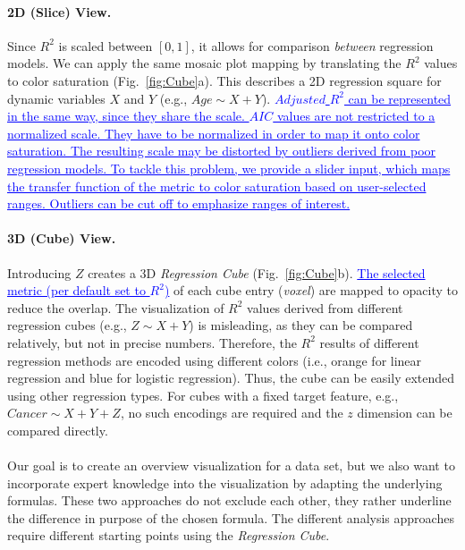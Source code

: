 \documentclass[journal]{style/vgtc} 			          %
\newcommand{\add}[1]{\textcolor{blue}{\uline{#1}}}
\begin{document}
\paragraph{2D (Slice) View.}
Since $R^2$ is scaled between $[0, 1]$, it allows for comparison \emph{between} regression models.
We can apply the same mosaic plot mapping by translating the $R^2$ values to color saturation (Fig.~\ref{fig:Cube}a).
This describes a 2D regression square for dynamic variables $X$ and $Y$ (e.g., $Age \sim X + Y$).
\add{
$Adjusted$ $R^2$ can be represented in the same way, since they share the scale.
$AIC$ values are not restricted to a normalized scale.
They have to be normalized in order to map it onto color saturation.
The resulting scale may be distorted by outliers derived from poor regression models.
To tackle this problem, we provide a slider input, which maps the transfer function of the metric to color saturation based on user-selected ranges.
Outliers can be cut off to emphasize ranges of interest.
}

\paragraph{3D (Cube) View.}
Introducing $Z$ creates a 3D \emph{Regression Cube} (Fig.~\ref{fig:Cube}b).
\add{The selected metric (per default set to $R^2$)} of each cube entry (\emph{voxel}) are mapped to opacity to reduce the overlap.
The visualization of $R^2$ values derived from different regression cubes (e.g., $Z \sim X + Y$) is misleading, as they can be compared relatively, but not in precise numbers.
Therefore, the $R^2$ results of different regression methods are encoded using different colors (i.e., orange for linear regression and blue for logistic regression).
Thus, the cube can be easily extended using other regression types.
For cubes with a fixed target feature, e.g., $Cancer \sim X + Y + Z$, no such encodings are required and the $z$ dimension can be compared directly.
\\\\
Our goal is to create an overview visualization for a data set, but we also want to incorporate expert knowledge into the visualization by adapting the underlying formulas.
These two approaches do not exclude each other, they rather underline the difference in purpose of the chosen formula.
The different analysis approaches require different starting points using the \emph{Regression Cube}.
\end{document}

